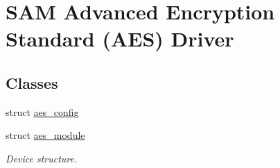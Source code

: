 \hypertarget{group__asfdoc__sam0__drivers__aes__group}{}\section{S\+A\+M Advanced Encryption Standard (A\+E\+S) Driver}
\label{group__asfdoc__sam0__drivers__aes__group}
\subsection*{Classes}
\begin{DoxyCompactItemize}
\item 
struct \hyperlink{structaes__config}{aes\+\_\+config}
\item 
struct \hyperlink{structaes__module}{aes\+\_\+module}
\begin{DoxyCompactList}\small\item\em Device structure. \end{DoxyCompactList}\end{DoxyCompactItemize}
